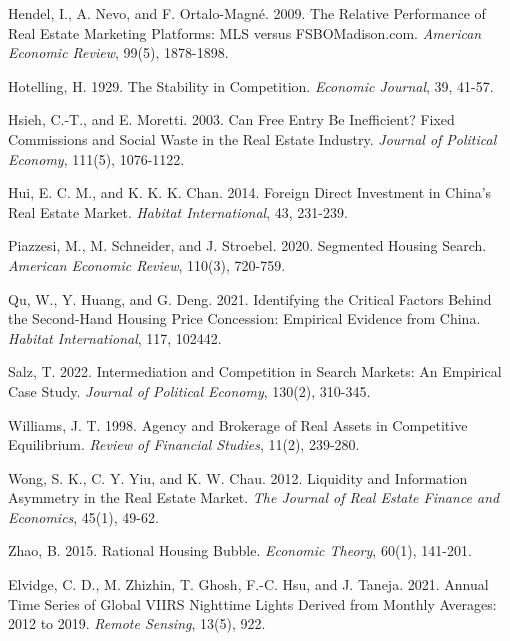 \documentclass[11pt]{article}
\begin{document}
\begin{singlespace}
\begin{thebibliography}{}
  Hendel, I., A. Nevo, and F. Ortalo-Magné. 2009. The Relative Performance of Real Estate Marketing Platforms: MLS versus FSBOMadison.com. \textit{American Economic Review}, 99(5), 1878-1898.
  
  Hotelling, H. 1929. The Stability in Competition. \textit{Economic Journal}, 39, 41-57.
  
  Hsieh, C.-T., and E. Moretti. 2003. Can Free Entry Be Inefficient? Fixed Commissions and Social Waste in the Real Estate Industry. \textit{Journal of Political Economy}, 111(5), 1076-1122.
  
  Hui, E. C. M., and K. K. K. Chan. 2014. Foreign Direct Investment in China's Real Estate Market. \textit{Habitat International}, 43, 231-239.
  
  Piazzesi, M., M. Schneider, and J. Stroebel. 2020. Segmented Housing Search. \textit{American Economic Review}, 110(3), 720-759.
  
  Qu, W., Y. Huang, and G. Deng. 2021. Identifying the Critical Factors Behind the Second-Hand Housing Price Concession: Empirical Evidence from China. \textit{Habitat International}, 117, 102442.
  
  Salz, T. 2022. Intermediation and Competition in Search Markets: An Empirical Case Study. \textit{Journal of Political Economy}, 130(2), 310-345.
  
  Williams, J. T. 1998. Agency and Brokerage of Real Assets in Competitive Equilibrium. \textit{Review of Financial Studies}, 11(2), 239-280.
  
  Wong, S. K., C. Y. Yiu, and K. W. Chau. 2012. Liquidity and Information Asymmetry in the Real Estate Market. \textit{The Journal of Real Estate Finance and Economics}, 45(1), 49-62.
  
  Zhao, B. 2015. Rational Housing Bubble. \textit{Economic Theory}, 60(1), 141-201.
  
  Elvidge, C. D., M. Zhizhin, T. Ghosh, F.-C. Hsu, and J. Taneja. 2021. Annual Time Series of Global VIIRS Nighttime Lights Derived from Monthly Averages: 2012 to 2019. \textit{Remote Sensing}, 13(5), 922.
  

\end{thebibliography}
\end{singlespace}
\end{document}
